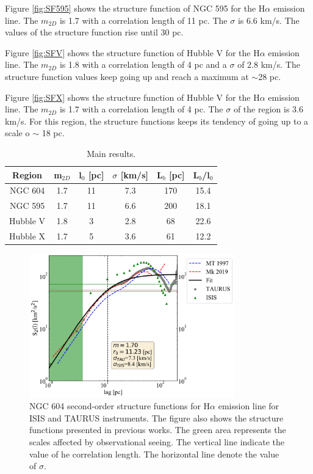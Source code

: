 \documentclass[fleqn,usenatbib]{mnras}
\begin{document}
Figure \ref{fig:SF595} shows the structure function of NGC 595 for the H$\alpha$ emission line. The $m_{2D}$ is 1.7 with a correlation length of 11 pc. The $\sigma$ is 6.6 km/s. The values of the structure function rise until 30 pc. 

Figure \ref{fig:SFV} shows the structure function of Hubble V for the H$\alpha$ emission line. The $m_{2D}$ is 1.8 with a correlation length of 4 pc and a $\sigma$ of 2.8 km/s. The structure function values keep going up and reach a maximum at $\sim$28 pc.

Figure \ref{fig:SFX} shows the structure function of Hubble V for the H$\alpha$ emission line. The $m_{2D}$ is 1.7 with a correlation length of 4 pc. The $\sigma$ of the region is 3.6 km/s. For this region, the structure functions keeps its tendency of going up to a scale o $\sim$ 18 pc.

\begin{table}
\begin{center}\caption{Main results.}
\begin{tabular}{cccccc}\hline
Region   &  m$_{2D}$  & l$_{0}$ [pc] & $\sigma$ [km/s] & L$_{b}$ [pc]  & L$_{b}$/l$_{0}$ \\\hline
NGC 604 &     1.7   &     11       &    7.3         & 170  &  15.4 	\\
NGC 595 &      1.7   &     11      &    6.6        & 200  & 18.1 \\
Hubble V &   1.8   &     3       &    2.8      & 68  &     22.6  	\\
Hubble X &     1.7   &     5       &    3.6      & 61  &  12.2 	\\
\end{tabular}\label{tab:Res}
\end{center}
\end{table} 

\begin{figure}
\centering 
\includegraphics[width=3.5in]{Figures/SF604.pdf}
\caption{NGC 604 second-order structure functions for H$\alpha$ emission line for ISIS and TAURUS instruments. The figure also shows the structure functions presented in previous works. The green area represents the scales affected by observational seeing. The vertical line indicate the value of he correlation length. The horizontal line denote the value of $\sigma$.}
\label{fig:SF604}
\end{figure}
\end{document}
